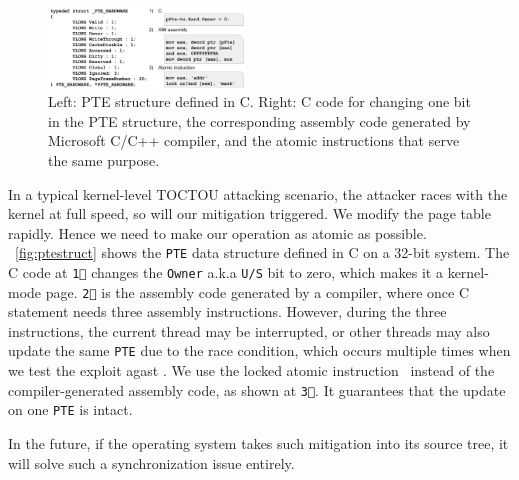 \begin{figure}[th]
  \includegraphics[width=0.47\textwidth]{figures/ptestructcode}
  \centering
  \caption{Left: PTE structure defined in C. Right: C code for changing one bit in the PTE structure, the corresponding assembly code generated by Microsoft C/C++ compiler, and the atomic instructions that serve the same purpose.}
  \label{fig:ptestruct}
\end{figure}


In a typical kernel-level TOCTOU attacking scenario, the attacker races with the kernel at full speed, so will our mitigation triggered. We modify the page table rapidly. Hence we need to make our operation as atomic as possible. ~\autoref{fig:ptestruct} shows the \texttt{PTE} data structure defined in C on a 32-bit system. The C code at \texttt{\textcircled{1}} changes the \texttt{Owner} a.k.a \texttt{U/S} bit to zero, which makes it a kernel-mode page. \texttt{\textcircled{2}} is the assembly code generated by a compiler, where once C statement needs three assembly instructions. However, during the three instructions, the current thread may be interrupted, or other threads may also update the same \texttt{PTE} due to the race condition, which occurs multiple times when we test the exploit agast \name. We use the locked atomic instruction~\cite{intelmanualchapter8} instead of the compiler-generated assembly code, as shown at \texttt{\textcircled{3}}. It guarantees that the update on one \texttt{PTE} is intact. 

In the future, if the operating system takes such mitigation into its source tree, it will solve such a synchronization issue entirely.

